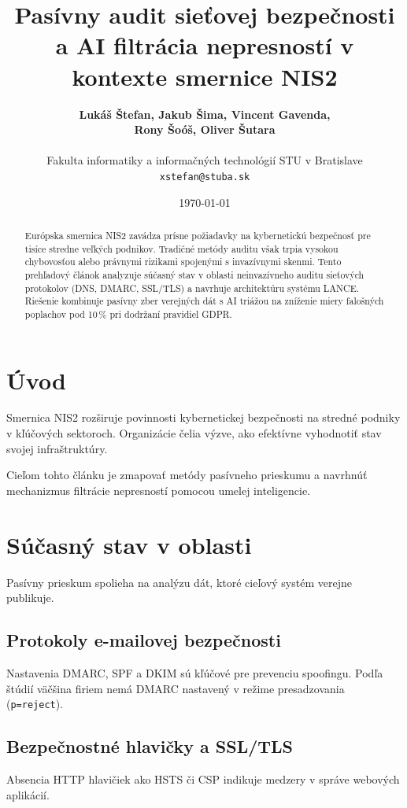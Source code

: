 \documentclass[11pt,a4paper,twocolumn]{article}
\title{\textbf{Pasívny audit sieťovej bezpečnosti a AI filtrácia nepresností v kontexte smernice NIS2}}
\author{
    \textbf{Lukáš Štefan, Jakub Šima, Vincent Gavenda,}\\
    \textbf{Rony Šoóš, Oliver Šutara}\\
    \vspace{0.3em}\\
    Fakulta informatiky a informačných technológií STU v Bratislave\\
    \texttt{xstefan@stuba.sk}
}
\date{\today}
\begin{document}
\maketitle

\begin{abstract}
Európska smernica NIS2 zavádza prísne požiadavky na kybernetickú bezpečnosť pre tisíce stredne veľkých podnikov. Tradičné metódy auditu však trpia vysokou chybovosťou alebo právnymi rizikami spojenými s invazívnymi skenmi. Tento prehľadový článok analyzuje súčasný stav v oblasti neinvazívneho auditu sieťových protokolov (DNS, DMARC, SSL/TLS) a navrhuje architektúru systému LANCE. Riešenie kombinuje pasívny zber verejných dát s AI triážou na zníženie miery falošných poplachov pod 10\,\% pri dodržaní pravidiel GDPR.
\end{abstract}

\section{Úvod}
Smernica NIS2 \cite{nis2directive} rozširuje povinnosti kybernetickej bezpečnosti na stredné podniky v kľúčových sektoroch. Organizácie čelia výzve, ako efektívne vyhodnotiť stav svojej infraštruktúry.

Cieľom tohto článku je zmapovať metódy pasívneho prieskumu a navrhnúť mechanizmus filtrácie nepresností pomocou umelej inteligencie.

\section{Súčasný stav v oblasti}
Pasívny prieskum spolieha na analýzu dát, ktoré cieľový systém verejne publikuje.

\subsection{Protokoly e-mailovej bezpečnosti}
Nastavenia DMARC, SPF a DKIM sú kľúčové pre prevenciu spoofingu. Podľa štúdií \cite{valimail2023, cloudflare2024} väčšina firiem nemá DMARC nastavený v režime presadzovania (\texttt{p=reject}).

\subsection{Bezpečnostné hlavičky a SSL/TLS}
Absencia HTTP hlavičiek ako HSTS či CSP \cite{mozillaobs, securityheaders} indikuje medzery v správe webových aplikácií.
\end{document}
